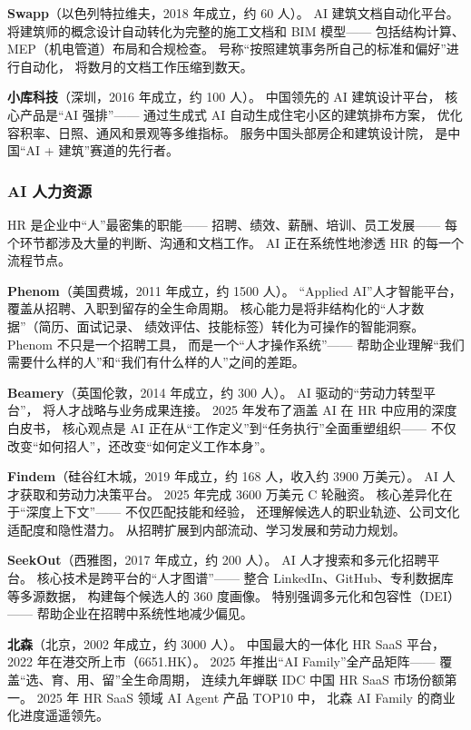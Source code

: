 \textbf{Swapp}（以色列特拉维夫，2018 年成立，约 60 人）。
AI 建筑文档自动化平台。
将建筑师的概念设计自动转化为完整的施工文档和 BIM 模型——
包括结构计算、MEP（机电管道）布局和合规检查。
号称``按照建筑事务所自己的标准和偏好''进行自动化，
将数月的文档工作压缩到数天。

\textbf{小库科技}（深圳，2016 年成立，约 100 人）。
中国领先的 AI 建筑设计平台，
核心产品是``AI 强排''——
通过生成式 AI 自动生成住宅小区的建筑排布方案，
优化容积率、日照、通风和景观等多维指标。
服务中国头部房企和建筑设计院，
是中国``AI + 建筑''赛道的先行者。

\subsubsection{AI 人力资源}

HR 是企业中``人''最密集的职能——
招聘、绩效、薪酬、培训、员工发展——
每个环节都涉及大量的判断、沟通和文档工作。
AI 正在系统性地渗透 HR 的每一个流程节点。

\textbf{Phenom}（美国费城，2011 年成立，约 1500 人）。
``Applied AI''人才智能平台，
覆盖从招聘、入职到留存的全生命周期。
核心能力是将非结构化的``人才数据''（简历、面试记录、
绩效评估、技能标签）转化为可操作的智能洞察。
Phenom 不只是一个招聘工具，
而是一个``人才操作系统''——
帮助企业理解``我们需要什么样的人''和``我们有什么样的人''之间的差距。

\textbf{Beamery}（英国伦敦，2014 年成立，约 300 人）。
AI 驱动的``劳动力转型平台''，
将人才战略与业务成果连接。
2025 年发布了涵盖 AI 在 HR 中应用的深度白皮书，
核心观点是 AI 正在从``工作定义''到``任务执行''全面重塑组织——
不仅改变``如何招人''，还改变``如何定义工作本身''。

\textbf{Findem}（硅谷红木城，2019 年成立，约 168 人，收入约 3900 万美元）。
AI 人才获取和劳动力决策平台。
2025 年完成 3600 万美元 C 轮融资。
核心差异化在于``深度上下文''——
不仅匹配技能和经验，
还理解候选人的职业轨迹、公司文化适配度和隐性潜力。
从招聘扩展到内部流动、学习发展和劳动力规划。

\textbf{SeekOut}（西雅图，2017 年成立，约 200 人）。
AI 人才搜索和多元化招聘平台。
核心技术是跨平台的``人才图谱''——
整合 LinkedIn、GitHub、专利数据库等多源数据，
构建每个候选人的 360 度画像。
特别强调多元化和包容性（DEI）——
帮助企业在招聘中系统性地减少偏见。

\textbf{北森}（北京，2002 年成立，约 3000 人）。
中国最大的一体化 HR SaaS 平台，
2022 年在港交所上市（6651.HK）。
2025 年推出``AI Family''全产品矩阵——
覆盖``选、育、用、留''全生命周期，
连续九年蝉联 IDC 中国 HR SaaS 市场份额第一。
2025 年 HR SaaS 领域 AI Agent 产品 TOP10 中，
北森 AI Family 的商业化进度遥遥领先。

